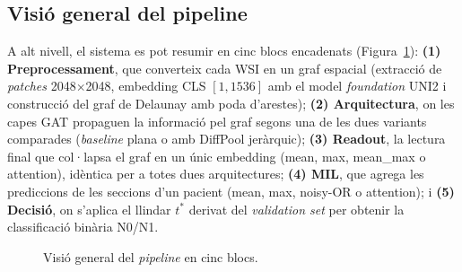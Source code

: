 \documentclass[10pt,a4paper,twocolumn,twoside]{article}
\begin{document}
\subsection{Visió general del pipeline}
\label{sec:pipeline-overview}

A alt nivell, el sistema es pot resumir en cinc blocs encadenats
(Figura~\ref{fig:pipeline-overview}): \textbf{(1) Preprocessament}, que converteix cada WSI en
un graf espacial (extracció de \textit{patches} 2048$\times$2048, embedding CLS $[1, 1536]$ amb el
model \textit{foundation} UNI2 i construcció del graf de Delaunay amb poda d'arestes);
\textbf{(2) Arquitectura}, on les capes GAT propaguen la informació pel graf segons una de les
dues variants comparades (\textit{baseline} plana o amb DiffPool jeràrquic);
\textbf{(3) Readout}, la lectura final que col·lapsa el graf en un únic embedding (mean, max,
mean\_max o attention), idèntica per a totes dues arquitectures; \textbf{(4) MIL}, que
agrega les prediccions de les seccions d'un pacient (mean, max, noisy-OR o attention); i
\textbf{(5) Decisió}, on s'aplica el llindar $t^*$ derivat del \textit{validation set} per
obtenir la classificació binària N0/N1.

\begin{figure}[h]
\centering
{}
\caption{Visió general del \textit{pipeline} en cinc blocs.}
\label{fig:pipeline-overview}
\end{figure}
\end{document}
